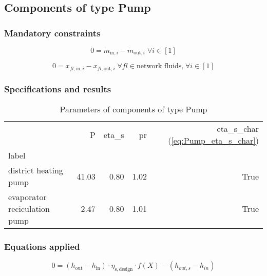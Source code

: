 \subsection{Components of type Pump}

\subsubsection{Mandatory constraints}

\begin{equation}
\label{eq:Pump_mass_flow_constraints}
0=\dot{m}_{\mathrm{in,}i}-\dot{m}_{\mathrm{out,}i}\; \forall i \in [1]
\end{equation}

\begin{equation}
\label{eq:Pump_fluid_constraints}
0=x_{fl\mathrm{,in,}i}-x_{fl\mathrm{,out,}i}\;\forall fl \in\text{network fluids,}\; \forall i \in [1]
\end{equation}


\subsubsection{Specifications and results}

\begin{table}[H]
\centering
\caption{Parameters of components of type Pump}
\begin{tabular}{lrrrr}
\toprule
{} &      P & eta\_s &    pr &  eta\_s\_char (\ref{eq:Pump_eta_s_char}) \\
label                        &        &        &       &                                          \\
\midrule
district heating pump        &  41.03 &   0.80 &  1.02 &                                     True \\
evaporator reciculation pump &   2.47 &   0.80 &  1.01 &                                     True \\
\bottomrule
\end{tabular}
\end{table}
\subsubsection{Equations applied}

\begin{equation}
\label{eq:Pump_eta_s_char}
0=\left(h_\mathrm{out}-h_\mathrm{in}\right)\cdot\eta_\mathrm{s,design}\cdot f\left( X \right)-\left( h_{out,s} - h_{in} \right)
\end{equation}

